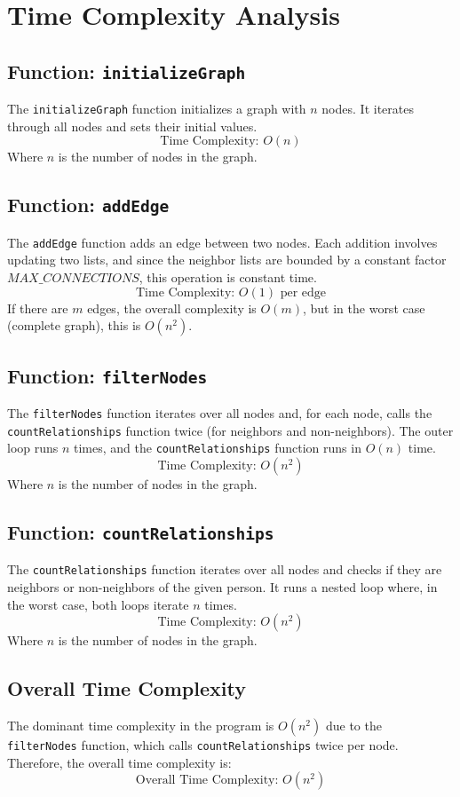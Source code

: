 \documentclass[a4paper,12pt]{report}
\begin{document}
\section*{Time Complexity Analysis}

\subsection*{Function: \texttt{initializeGraph}}
The \texttt{initializeGraph} function initializes a graph with \(n\) nodes. It iterates through all nodes and sets their initial values.
\[
\text{Time Complexity: } O(n)
\]
Where \(n\) is the number of nodes in the graph.

\subsection*{Function: \texttt{addEdge}}
The \texttt{addEdge} function adds an edge between two nodes. Each addition involves updating two lists, and since the neighbor lists are bounded by a constant factor \(MAX\_CONNECTIONS\), this operation is constant time.
\[
\text{Time Complexity: } O(1) \text{ per edge}
\]
If there are \(m\) edges, the overall complexity is \(O(m)\), but in the worst case (complete graph), this is \(O(n^2)\).

\subsection*{Function: \texttt{filterNodes}}
The \texttt{filterNodes} function iterates over all nodes and, for each node, calls the \texttt{countRelationships} function twice (for neighbors and non-neighbors). The outer loop runs \(n\) times, and the \texttt{countRelationships} function runs in \(O(n)\) time.
\[
\text{Time Complexity: } O(n^2)
\]
Where \(n\) is the number of nodes in the graph.

\subsection*{Function: \texttt{countRelationships}}
The \texttt{countRelationships} function iterates over all nodes and checks if they are neighbors or non-neighbors of the given person. It runs a nested loop where, in the worst case, both loops iterate \(n\) times.
\[
\text{Time Complexity: } O(n^2)
\]
Where \(n\) is the number of nodes in the graph.

\subsection*{Overall Time Complexity}
The dominant time complexity in the program is \(O(n^2)\) due to the \texttt{filterNodes} function, which calls \texttt{countRelationships} twice per node. Therefore, the overall time complexity is:
\[
\text{Overall Time Complexity: } O(n^2)
\]
\end{document}
